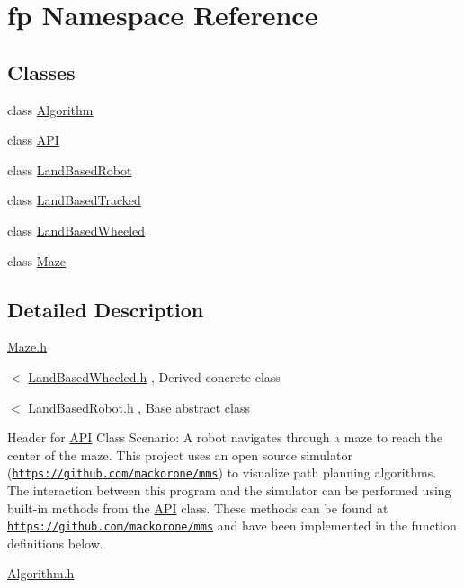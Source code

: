 \hypertarget{namespacefp}{}\section{fp Namespace Reference}
\label{namespacefp}
\subsection*{Classes}
\begin{DoxyCompactItemize}
\item 
class \hyperlink{classfp_1_1_algorithm}{Algorithm}
\item 
class \hyperlink{classfp_1_1_a_p_i}{A\+PI}
\item 
class \hyperlink{classfp_1_1_land_based_robot}{Land\+Based\+Robot}
\item 
class \hyperlink{classfp_1_1_land_based_tracked}{Land\+Based\+Tracked}
\item 
class \hyperlink{classfp_1_1_land_based_wheeled}{Land\+Based\+Wheeled}
\item 
class \hyperlink{classfp_1_1_maze}{Maze}
\end{DoxyCompactItemize}


\subsection{Detailed Description}
\hyperlink{_maze_8h}{Maze.\+h}

$<$ \hyperlink{landbasedwheeled_8h}{Land\+Based\+Wheeled.\+h} , Derived concrete class

$<$ \hyperlink{_land_based_robot_8h}{Land\+Based\+Robot.\+h} , Base abstract class

Header for \hyperlink{classfp_1_1_a_p_i}{A\+PI} Class Scenario\+: A robot navigates through a maze to reach the center of the maze. This project uses an open source simulator (\href{https://github.com/mackorone/mms}{\tt https\+://github.\+com/mackorone/mms}) to visualize path planning algorithms. The interaction between this program and the simulator can be performed using built-\/in methods from the \hyperlink{classfp_1_1_a_p_i}{A\+PI} class. These methods can be found at \href{https://github.com/mackorone/mms}{\tt https\+://github.\+com/mackorone/mms} and have been implemented in the function definitions below.

\hyperlink{_algorithm_8h}{Algorithm.\+h} 
